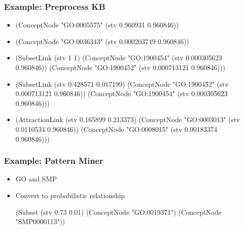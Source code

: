 \documentclass[aspectratio=169]{beamer}
\begin{document}
\begin{frame}[fragile]
  \frametitle{Example: Preprocess KB}

  \begin{itemize}
  \item
    {\tiny \begin{semiverbatim}
(ConceptNode "GO:0005575" (stv 0.960931 0.960846))
    \end{semiverbatim}}
  \item
    {\tiny \begin{semiverbatim}
(ConceptNode "GO:0036343" (stv 0.000203749 0.960846))
    \end{semiverbatim}}
  \item
    {\tiny \begin{semiverbatim}
(SubsetLink (stv 1 1)
  (ConceptNode "GO:1900454" (stv 0.000305623 0.960846))
  (ConceptNode "GO:1900452" (stv 0.000713121 0.960846)))
    \end{semiverbatim}}
  \item
    {\tiny \begin{semiverbatim}
(SubsetLink (stv 0.428571 0.017199)
  (ConceptNode "GO:1900452" (stv 0.000713121 0.960846))
  (ConceptNode "GO:1900454" (stv 0.000305623 0.960846)))
    \end{semiverbatim}}
  \item
    {\tiny \begin{semiverbatim}
(AttractionLink (stv 0.165899 0.213373)
  (ConceptNode "GO:0003013" (stv 0.0110534 0.960846))
  (ConceptNode "GO:0008015" (stv 0.00183374 0.960846)))
    \end{semiverbatim}}
  \end{itemize}

\end{frame}

\begin{frame}[fragile]
  \frametitle{Example: Pattern Miner}


  \begin{itemize}
  \item GO and SMP
    {\tiny {}}
  \item Convert to probabilistic relationship
    {\tiny \begin{semiverbatim}
(Subset (stv 0.73 0.01)
  (ConceptNode "GO:0019371")
  (ConceptNode "SMP0000113"))      
    \end{semiverbatim}}
  \end{itemize}
\end{frame}
\end{document}
